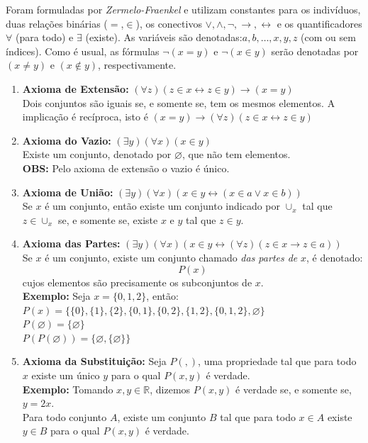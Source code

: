 \documentclass[oneside,a4paper,12pt]{article}
\begin{document}
Foram formuladas por {\it Zermelo-Fraenkel} e utilizam constantes para os indivíduos, duas relações binárias ($=$,$\in$), os conectivos $\lor, \land, \neg, \rightarrow, \leftrightarrow$ e os quantificadores $\forall$ (para todo) e $\exists$ (existe). As variáveis são denotadas:$a,b,\dots,x,y,z$ (com ou sem índices). Como é usual, as fórmulas $\neg(x=y)$ e $\neg(x \in y)$ serão denotadas por $(x \neq y)$ e $(x \notin y)$, respectivamente.
\begin{enumerate}
	
	\item \textbf{Axioma de Extensão: } $(\forall z)(z \in x \leftrightarrow z \in y) \rightarrow (x = y)$ \\ Dois conjuntos são iguais se, e somente se, tem os mesmos elementos. A implicação é recíproca, isto é $(x = y) \rightarrow (\forall z)(z \in x \leftrightarrow z \in y)$
	
	\item \textbf{Axioma do Vazio: } $(\exists y)(\forall x)(x \in y)$ \\ Existe um conjunto, denotado por $\varnothing$, que não tem elementos. \\ \textbf{OBS: } Pelo axioma de extensão o vazio é único.
	
	\item \textbf{Axioma de União: } $(\exists y)(\forall x)(x\in y \leftrightarrow (x\in a \lor x \in b))$  \\ Se $x$ é um conjunto, então existe um conjunto indicado por $\cup_x$ tal que $z \in \cup_x$ se, e somente se, existe $x$ e $y$ tal que $z \in y$.
	
	\item \textbf{Axioma das Partes: } $(\exists y)(\forall x)(x \in y \leftrightarrow (\forall z)(z \in x \rightarrow z \in a))$ \\ Se $x$ é um conjunto, existe um conjunto chamado {\it das partes de} $x$, é denotado: $$P(x)$$ cujos elementos são precisamente os subconjuntos de $x$. \\ \textbf{Exemplo: } Seja $x = \{0,1,2\}$, então:
	\\$P(x) = \{ \{0\}, \{1\}, \{2\}, \{0,1\}, \{0,2\}, \{1,2\}, \{0,1,2\}, \varnothing \}$
	\\$P(\varnothing) = \{ \varnothing \}$
	\\$P(P(\varnothing)) = \{ \varnothing, \{\varnothing\} \}$
	
	\item \textbf{Axioma da Substituição: } Seja $P( , )$, uma propriedade tal que para todo $x$ existe um único $y$ para o qual $P(x,y)$ é verdade.
	\\ \textbf{Exemplo: }Tomando $x,y \in \mathbb{R}$, dizemos $P(x,y)$ é verdade se, e somente se, $y=2x$.
	\\ Para todo conjunto $A$, existe um conjunto $B$ tal que para todo $x \in A$ existe $y \in B$ para o qual $P(x,y)$ é verdade.
	

\end{enumerate}
\end{document}
